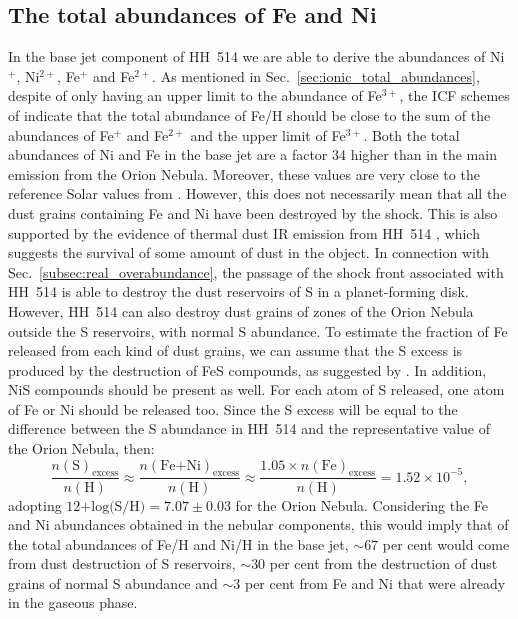 \documentclass[fleqn,usenatbib]{mnras}
\begin{document}
\subsection{The total abundances of Fe and Ni}
\label{subsec:totalFeandNi}

In the base jet component of HH~514 we are able to derive the abundances of Ni$^{+}$, Ni$^{2+}$, Fe$^{+}$ and Fe$^{2+}$. As mentioned in Sec.~\ref{sec:ionic_total_abundances}, despite of only having an upper limit to the abundance of Fe$^{3+}$, the ICF schemes of \citet{rodriguez05} indicate that the total abundance of Fe/H should be close to the sum of the abundances of Fe$^{+}$ and Fe$^{2+}$ and the upper limit of Fe$^{3+}$. Both the total abundances of Ni and Fe in the base jet are a factor 34 higher than in the main emission from the Orion Nebula. Moreover, these values are very close to the reference Solar values from \citet{lodders19}. However, this does not necessarily mean that all the dust grains containing Fe and Ni have been destroyed by the shock. This is also supported by the evidence of thermal dust IR emission from HH~514 \citep{smith05}, which suggests the survival of some amount of dust in the object. In connection with Sec.~\ref{subsec:real_overabundance}, the passage of the shock front associated with HH~514 is able to destroy the dust reservoirs of S in a planet-forming disk. However, HH~514 can also destroy dust grains of zones of the Orion Nebula outside the S  reservoirs, with normal S abundance. To estimate the fraction of Fe released from each kind of dust grains, we can assume that the S excess is produced by the destruction of FeS compounds, as suggested by \citet{Kama19}. In addition, NiS compounds should be present as well. For each atom of S released, one atom of Fe or Ni should be released too. Since the S excess will be equal to the difference between the S abundance in HH~514 and the representative value of the Orion Nebula, then:
\begin{equation*}
    \frac{n(\text{S})_{\text{excess}}}{n(\text{H})}\approx\frac{n(\text{Fe+Ni})_{\text{excess}}}{n(\text{H})}\approx\frac{1.05\times n(\text{Fe})_{\text{excess}}}{n(\text{H})}=1.52\times 10^{-5},
\end{equation*}
adopting $\text{12+log(S/H)}=7.07 \pm 0.03$ \citep{mendez2021-2} for the Orion Nebula. Considering the Fe and Ni abundances obtained in the nebular components, this would imply that of the total abundances of Fe/H and Ni/H in the base jet, $\sim$67 per cent would come from dust destruction of S reservoirs, $\sim$30 per cent from the destruction of dust grains of normal S abundance and $\sim$3 per cent from Fe and Ni that were already in the gaseous phase. %
\end{document}
